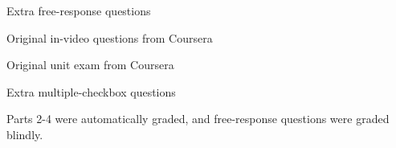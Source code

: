 \documentclass{sigchi}
\begin{document}
\begin{compactenum}
\item Extra free-response questions %
\item Original in-video questions from Coursera%
\item Original unit exam from Coursera%
\item Extra multiple-checkbox questions %
\end{compactenum}

Parts 2-4 were automatically graded, and free-response questions were graded blindly. %




\end{document}
